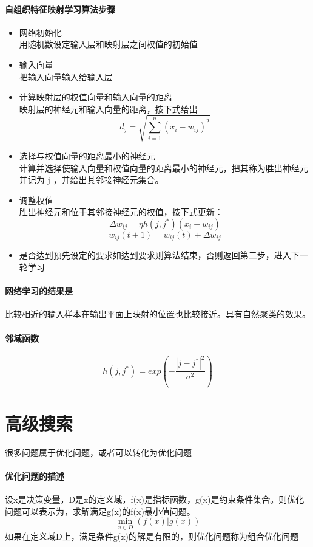 \documentclass[UTF8,a4paper]{ctexart}
\begin{document}
\paragraph{自组织特征映射学习算法步骤}
\begin{itemize}
	\item 网络初始化\\
	      用随机数设定输入层和映射层之间权值的初始值
	\item 输入向量\\
	      把输入向量输入给输入层
	\item 计算映射层的权值向量和输入向量的距离\\
	      映射层的神经元和输入向量的距离，按下式给出
	      \[d_j = \sqrt{\displaystyle{\sum_{i  =1}^n} (x_i - w_{ij})^2}\]
	\item 选择与权值向量的距离最小的神经元\\
	      计算并选择使输入向量和权值向量的距离最小的神经元，把其称为胜出神经元并记为 j ，并给出其邻接神经元集合。
	\item 调整权值 \\
	      胜出神经元和位于其邻接神经元的权值，按下式更新：
	      \[\Delta w_{ij}= \eta h(j , j^*)(x_i - w_{ij})\]
	      \[w_{ij}(t + 1) = w_{ij}(t) + \Delta w_{ij}\]

	\item 是否达到预先设定的要求如达到要求则算法结束，否则返回第二步，进入下一轮学习
\end{itemize}

\paragraph{网络学习的结果是}比较相近的输入样本在输出平面上映射的位置也比较接近。具有自然聚类的效果。

\paragraph{邻域函数}
\[h(j , j^*) = exp(-\frac{|j-j^*|^2}{\sigma^2})\]

\section{高级搜索}
很多问题属于优化问题，或者可以转化为优化问题

\paragraph{优化问题的描述}
设x是决策变量，D是x的定义域，f(x)是指标函数，g(x)是约束条件集合。则优化问题可以表示为，求解满足g(x)的f(x)最小值问题。
\[\min_{	x \in D} (f(x)|g(x))\]
如果在定义域D上，满足条件g(x)的解是有限的，则优化问题称为组合优化问题
\end{document}
